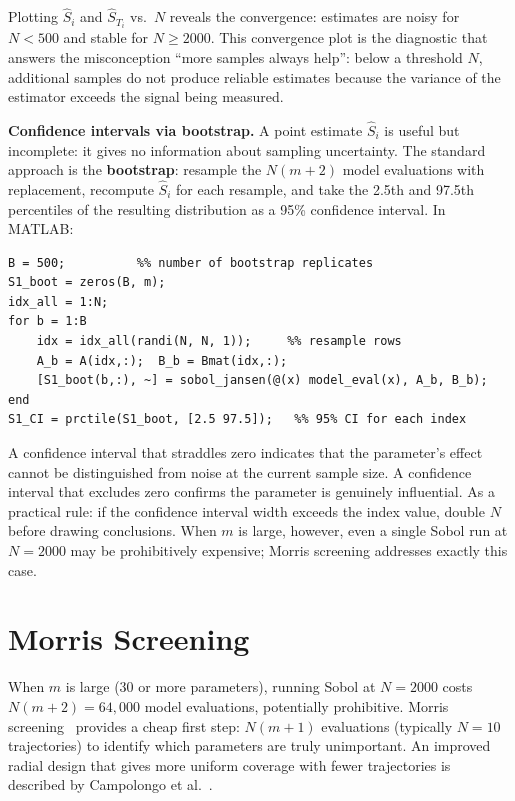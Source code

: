 Plotting $\hat{S}_i$ and $\hat{S}_{T_i}$ vs.\ $N$ reveals the convergence:
estimates are noisy for $N < 500$ and stable for $N \geq 2000$.
This convergence plot is the diagnostic that answers
the misconception ``more samples always help'': below a threshold
$N$, additional samples do not produce reliable estimates because
the variance of the estimator exceeds the signal being measured.

\textbf{Confidence intervals via bootstrap.}
A point estimate $\hat{S}_i$ is useful but incomplete: it gives no
information about sampling uncertainty.
The standard approach is the \textbf{bootstrap}: resample the
$N(m+2)$ model evaluations with replacement, recompute $\hat{S}_i$
for each resample, and take the 2.5th and 97.5th percentiles of
the resulting distribution as a 95\% confidence interval.
In MATLAB:
\begin{verbatim}
B = 500;          %% number of bootstrap replicates
S1_boot = zeros(B, m);
idx_all = 1:N;
for b = 1:B
    idx = idx_all(randi(N, N, 1));     %% resample rows
    A_b = A(idx,:);  B_b = Bmat(idx,:);
    [S1_boot(b,:), ~] = sobol_jansen(@(x) model_eval(x), A_b, B_b);
end
S1_CI = prctile(S1_boot, [2.5 97.5]);   %% 95% CI for each index
\end{verbatim}
A confidence interval that straddles zero indicates that the parameter's
effect cannot be distinguished from noise at the current sample size.
A confidence interval that excludes zero confirms the parameter is
genuinely influential. As a practical rule: if the confidence interval
width exceeds the index value, double $N$ before drawing conclusions.
When $m$ is large, however, even a single Sobol run at $N = 2000$
may be prohibitively expensive; Morris screening addresses exactly this case.

\section{Morris Screening}
\label{sec:morris}

When $m$ is large (30 or more parameters), running Sobol at $N = 2000$
costs $N(m+2) = 64{,}000$ model evaluations, potentially prohibitive.
Morris screening~\cite{morris1991factorial} provides a cheap first step:
$N(m+1)$ evaluations (typically $N = 10$ trajectories) to identify
which parameters are truly unimportant. An improved radial design
that gives more uniform coverage with fewer trajectories is
described by Campolongo et al.~\cite{campolongo2007effective}.

